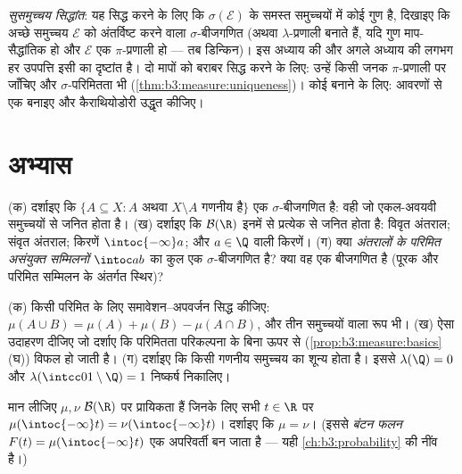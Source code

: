 \begin{method}\label{met:b3:measure:goodsets}
\emph{सुसमुच्चय सिद्धांत}: यह सिद्ध करने के लिए कि $\sigma(\mathcal E)$ के समस्त
समुच्चयों में कोई गुण है, दिखाइए कि अच्छे समुच्चय $\mathcal E$ को
अंतर्विष्ट करने वाला $\sigma$-बीजगणित (अथवा $\lambda$-प्रणाली बनाते हैं,
यदि गुण माप-सैद्धांतिक हो और $\mathcal E$ एक $\pi$-प्रणाली हो --- तब
डिन्किन)। इस अध्याय की और अगले अध्याय की लगभग हर उपपत्ति इसी का
दृष्टांत है। दो मापों को बराबर सिद्ध करने के लिए: उन्हें किसी जनक
$\pi$-प्रणाली पर जाँचिए और $\sigma$-परिमितता भी (\cref{thm:b3:measure:uniqueness})। कोई 
बनाने के लिए: आवरणों से एक  बनाइए और कैराथियोडोरी उद्धृत
कीजिए।
\end{method}

\section{अभ्यास}

\begin{exercise}[$\star$]\label{exo:b3:measure:1}
(क) दर्शाइए कि $\{A \subseteq X : A$ अथवा $X\setminus A$ गणनीय है$\}$ एक $\sigma$-बीजगणित
है: वही जो एकल-अवयवी समुच्चयों से जनित होता है।
(ख) दर्शाइए कि $\mathcal B(\R)$ इनमें से प्रत्येक से जनित होता है: विवृत
अंतराल; संवृत अंतराल; किरणें $\intoc{-\infty}a$; और $a \in \Q$ वाली किरणें।
(ग) क्या \emph{अंतरालों के परिमित असंयुक्त सम्मिलनों} $\intoc ab$ का
कुल एक $\sigma$-बीजगणित है? क्या वह एक बीजगणित है (पूरक और परिमित
सम्मिलन के अंतर्गत स्थिर)?
\end{exercise}

\begin{exercise}[$\star$]\label{exo:b3:measure:2}
(क) किसी परिमित  के लिए समावेशन--अपवर्जन सिद्ध कीजिए: $\mu(A\cup
B) = \mu(A) + \mu(B) - \mu(A\cap B)$,
और तीन समुच्चयों वाला रूप भी।
(ख) ऐसा उदाहरण दीजिए जो दर्शाए कि परिमितता परिकल्पना के बिना ऊपर
से  (\cref{prop:b3:measure:basics}(घ)) विफल हो जाती है।
(ग) दर्शाइए कि किसी गणनीय समुच्चय का  शून्य होता है।
इससे $\lambda(\Q) = 0$ और $\lambda(\intcc01\setminus\Q) =
1$ निष्कर्ष निकालिए।
\end{exercise}

\begin{exercise}[$\star\star$]\label{exo:b3:measure:3}
मान लीजिए $\mu, \nu$ $\mathcal B(\R)$ पर प्रायिकता  हैं जिनके लिए सभी $t \in \R$ पर
$\mu(\intoc{-\infty}t) = \nu(\intoc{-\infty}t)$। दर्शाइए कि $\mu = \nu$। (इससे \emph{बंटन फलन} $F(t) = \mu(\intoc{-\infty}t)$ एक 
अपरिवर्ती बन जाता है --- यही \cref{ch:b3:probability} की नींव है।)
\end{exercise}


